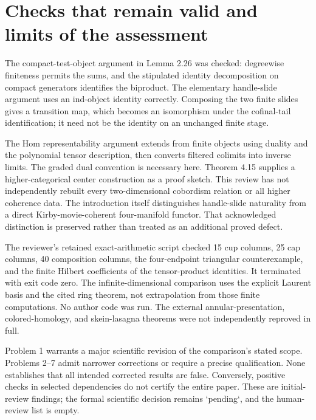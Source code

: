 \documentclass[10pt]{article}
\begin{document}
\section*{Checks that remain valid and limits of the assessment}
The compact-test-object argument in Lemma 2.26 was checked: degreewise finiteness permits the sums, and the stipulated identity decomposition on compact generators identifies the biproduct. The elementary handle-slide argument uses an ind-object identity correctly. Composing the two finite slides gives a transition map, which becomes an isomorphism under the cofinal-tail identification; it need not be the identity on an unchanged finite stage.\par
The Hom representability argument extends from finite objects using duality and the polynomial tensor description, then converts filtered colimits into inverse limits. The graded dual convention is necessary here. Theorem 4.15 supplies a higher-categorical center construction as a proof sketch. This review has not independently rebuilt every two-dimensional cobordism relation or all higher coherence data. The introduction itself distinguishes handle-slide naturality from a direct Kirby-movie-coherent four-manifold functor. That acknowledged distinction is preserved rather than treated as an additional proved defect.\par
The reviewer’s retained exact-arithmetic script checked 15 cup columns, 25 cap columns, 40 composition columns, the four-endpoint triangular counterexample, and the finite Hilbert coefficients of the tensor-product identities. It terminated with exit code zero. The infinite-dimensional comparison uses the explicit Laurent basis and the cited ring theorem, not extrapolation from those finite computations. No author code was run. The external annular-presentation, colored-homology, and skein-lasagna theorems were not independently reproved in full.\par
Problem 1 warrants a major scientific revision of the comparison’s stated scope. Problems 2–7 admit narrower corrections or require a precise qualification. None establishes that all intended corrected results are false. Conversely, positive checks in selected dependencies do not certify the entire paper. These are initial-review findings; the formal scientific decision remains `pending`, and the human-review list is empty.\par
\end{document}
